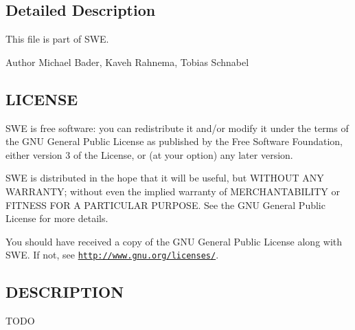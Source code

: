 \subsection{Detailed Description}
This file is part of S\-W\-E.

\begin{DoxyAuthor}{Author}
Michael Bader, Kaveh Rahnema, Tobias Schnabel
\end{DoxyAuthor}
\hypertarget{Writer_8hh_LICENSE}{}\subsection{L\-I\-C\-E\-N\-S\-E}\label{Writer_8hh_LICENSE}
S\-W\-E is free software\-: you can redistribute it and/or modify it under the terms of the G\-N\-U General Public License as published by the Free Software Foundation, either version 3 of the License, or (at your option) any later version.

S\-W\-E is distributed in the hope that it will be useful, but W\-I\-T\-H\-O\-U\-T A\-N\-Y W\-A\-R\-R\-A\-N\-T\-Y; without even the implied warranty of M\-E\-R\-C\-H\-A\-N\-T\-A\-B\-I\-L\-I\-T\-Y or F\-I\-T\-N\-E\-S\-S F\-O\-R A P\-A\-R\-T\-I\-C\-U\-L\-A\-R P\-U\-R\-P\-O\-S\-E. See the G\-N\-U General Public License for more details.

You should have received a copy of the G\-N\-U General Public License along with S\-W\-E. If not, see \href{http://www.gnu.org/licenses/}{\tt http\-://www.\-gnu.\-org/licenses/}.\hypertarget{NetCdfWriter_8hh_DESCRIPTION}{}\subsection{D\-E\-S\-C\-R\-I\-P\-T\-I\-O\-N}\label{NetCdfWriter_8hh_DESCRIPTION}
T\-O\-D\-O 

